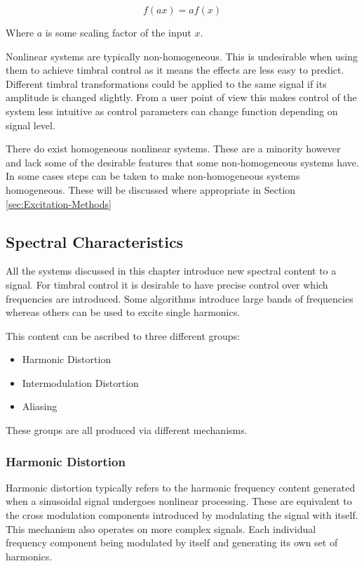 		\[ f(ax) = af(x) \]

		Where $a$ is some scaling factor of the input $x$.
		
		Nonlinear systems are typically non-homogeneous. This is undesirable when using them to achieve timbral
		control as it means the effects are less easy to predict. Different timbral transformations could be
		applied to the same signal if its amplitude is changed slightly. From a user point of view this makes
		control of the system less intuitive as control parameters can change function depending on signal level.


		There do exist homogeneous nonlinear systems. These are a minority however and lack some of the desirable
		features that some non-homogeneous systems have. In some cases steps can be taken to make non-homogeneous
		systems homogeneous. These will be discussed where appropriate in Section \ref{sec:Excitation-Methods}

	\subsection{Spectral Characteristics}
	\label{sec:Excitation-Evaluation-SpectralCharacteristics}
		All the systems discussed in this chapter introduce new spectral content to a signal. For timbral control
		it is desirable to have precise control over which frequencies are introduced. Some algorithms introduce
		large bands of frequencies whereas others can be used to excite single harmonics. 
		
		This content can be ascribed to three different groups:

		\begin{itemize}
			\item Harmonic Distortion
			\item Intermodulation Distortion
			\item Aliasing
		\end{itemize}

		These groups are all produced via different mechanisms. 

		\subsubsection*{Harmonic Distortion}
			Harmonic distortion typically refers to the harmonic frequency content generated when a sinusoidal
			signal undergoes nonlinear processing. These are equivalent to the cross modulation components
			introduced by modulating the signal with itself. This mechanism also operates on more complex
			signals. Each individual frequency component being modulated by itself and generating its own set
			of harmonics.

